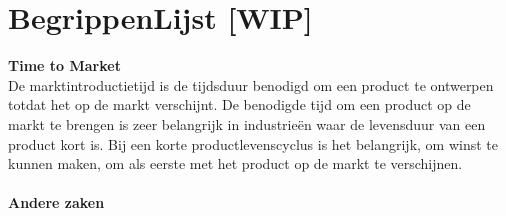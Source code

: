 
\chapter{BegrippenLijst [WIP]}


\textbf{Time to Market}\\
De marktintroductietijd is de tijdsduur benodigd om een product te ontwerpen totdat het op de markt verschijnt. De benodigde tijd om een product op de markt te brengen is zeer belangrijk in industrieën waar de levensduur van een product kort is. Bij een korte productlevenscyclus is het belangrijk, om winst te kunnen maken, om als eerste met het product op de markt te verschijnen.\\
\\
\textbf{Andere zaken} 

